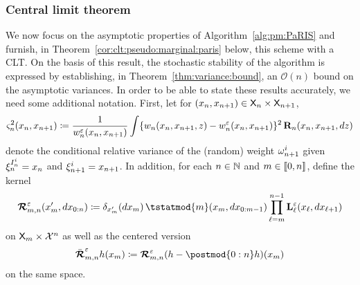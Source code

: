 
\subsubsection*{Central limit theorem}

We now focus on the asymptotic properties of Algorithm~\ref{alg:pm:PaRIS} and furnish, in Theorem~\ref{cor:clt:pseudo:marginal:paris} below, this scheme with a CLT. On the basis of this result, the stochastic stability of the algorithm is expressed by establishing, in Theorem~\ref{thm:variance:bound}, an $\mathcal{O}(n)$ bound on the asymptotic variances. In order to be able to state these results accurately, we need some additional notation. First, let 
 for $(x_n, x_{n + 1}) \in \mathsf{X}_n \times \mathsf{X}_{n + 1}$, 
\begin{multline} \label{eq:def:ukestvar}
\ukestvar{n}(x_n, x_{n + 1}) \eqdef 
\frac{1}{\wgtfuncmod{n}(x_n, x_{n + 1})} \int \{ \wgtfunc{n}(x_n, x_{n + 1}, z) - \wgtfuncmod{n}(x_n, x_{n + 1}) \}^2 \, \ukdist{n}(x_n, x_{n + 1}, \rmd z)
\end{multline}
denote the conditional relative variance of the (random) weight $\omega_{n + 1}^{i}$ given $\xi_{n}^{I_{n}^{i}} = x_n$ and $\xi_{n + 1}^{i}= x_{n + 1}$. In addition, for each $n \in \mathbb{N}$ and $m \in \llbracket 0, n \rrbracket$, define the kernel  
\begin{equation} \label{eq:def:retrokmodmod}
    \retrokmodmod_{m, n}(x_m', \rmd x_{0:n}) \eqdef \delta_{x_m'}(\rmd x_m) \,  
    \tstatmod{m}(x_m, \rmd x_{0:m - 1})
    \prod_{\ell = m}^{n - 1} \ukmod{\ell}(x_\ell, \rmd x_{\ell + 1})
\end{equation}
on $\mathsf{X}_m \times \mathcal{X}^n$ as well as the centered version 
\begin{equation} \label{eq:def:retrokmodmodnorm}
\retrokmodmodnorm_{m, n} h (x_m) \eqdef  \retrokmodmod_{m, n}(h - \postmod{0:n} h)(x_m) 
\end{equation}
on the same space. 

